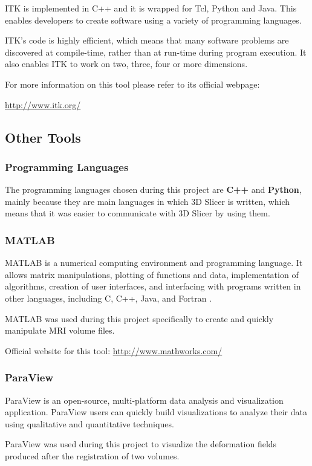 ITK  is implemented in C++ and it is wrapped for Tcl, Python and Java. This enables developers to create software using a variety of programming languages.

ITK's code is highly efficient, which means that many software problems are discovered at compile-time, rather than at run-time during program execution. It also enables ITK to work on two, three, four or more dimensions.

For more information on this tool please refer to its official webpage: 

\url{http://www.itk.org/}

\subsection{Other Tools}
\subsubsection{Programming Languages}
The programming languages chosen during this project are \textbf{C++} and \textbf{Python}, mainly because they are main languages in which 3D Slicer is written, which means that it was easier to communicate with 3D Slicer by using them.

\subsubsection{MATLAB}
MATLAB is a numerical computing environment and programming language. It allows matrix manipulations, plotting of functions and data, implementation of algorithms, creation of user interfaces, and interfacing with programs written in other languages, including C, C++, Java, and Fortran \cite{matlab}.

MATLAB was used during this project specifically to create and quickly manipulate MRI volume files.

Official website for this tool: \url{http://www.mathworks.com/}

\subsubsection{ParaView}
ParaView is an open-source, multi-platform data analysis and visualization application. ParaView users can quickly build visualizations to analyze their data using qualitative and quantitative techniques.

ParaView was used during this project to visualize the deformation fields produced after the registration of two volumes.

